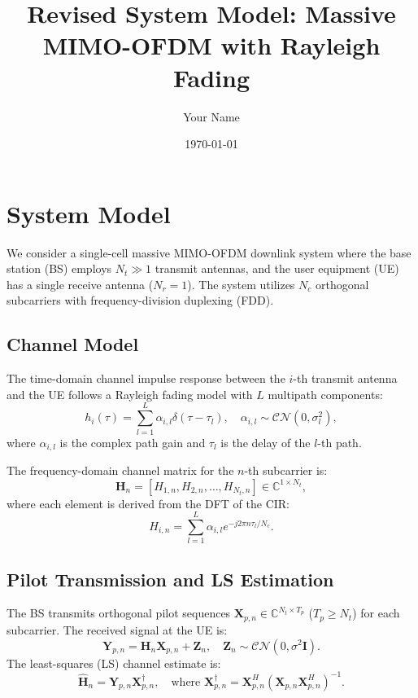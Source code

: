 \documentclass[10pt]{article}
\title{Revised System Model: Massive MIMO-OFDM with Rayleigh Fading}
\author{Your Name}
\date{\today}
\begin{document}
\maketitle

\section{System Model}
\label{sec:system_model}

We consider a single-cell massive MIMO-OFDM downlink system where the base station (BS) employs \(N_t \gg 1\) transmit antennas, and the user equipment (UE) has a single receive antenna (\(N_r = 1\)). The system utilizes \(N_c\) orthogonal subcarriers with frequency-division duplexing (FDD). 

\subsection{Channel Model}
The time-domain channel impulse response between the \(i\)-th transmit antenna and the UE follows a Rayleigh fading model with \(L\) multipath components:
\begin{equation}
h_i(\tau) = \sum_{l=1}^L \alpha_{i,l} \delta(\tau - \tau_l), \quad \alpha_{i,l} \sim \mathcal{CN}(0, \sigma_l^2),
\label{eq:cir}
\end{equation}
where \(\alpha_{i,l}\) is the complex path gain and \(\tau_l\) is the delay of the \(l\)-th path. 

The frequency-domain channel matrix for the \(n\)-th subcarrier is:
\begin{equation}
\mathbf{H}_n = \left[H_{1,n}, H_{2,n}, \dots, H_{N_t,n}\right] \in \mathbb{C}^{1 \times N_t},
\label{eq:freq_channel}
\end{equation}
where each element is derived from the DFT of the CIR:
\begin{equation}
H_{i,n} = \sum_{l=1}^L \alpha_{i,l} e^{-j 2\pi n \tau_l / N_c}.
\label{eq:subcarrier_channel}
\end{equation}

\subsection{Pilot Transmission and LS Estimation}
The BS transmits orthogonal pilot sequences \(\mathbf{X}_{p,n} \in \mathbb{C}^{N_t \times T_p}\) (\(T_p \geq N_t\)) for each subcarrier. The received signal at the UE is:
\begin{equation}
\mathbf{Y}_{p,n} = \mathbf{H}_n \mathbf{X}_{p,n} + \mathbf{Z}_n, \quad \mathbf{Z}_n \sim \mathcal{CN}(0, \sigma^2 \mathbf{I}).
\label{eq:received_pilot}
\end{equation}
The least-squares (LS) channel estimate is:
\begin{equation}
\hat{\mathbf{H}}_n = \mathbf{Y}_{p,n} \mathbf{X}_{p,n}^\dagger, \quad \text{where } \mathbf{X}_{p,n}^\dagger = \mathbf{X}_{p,n}^H (\mathbf{X}_{p,n} \mathbf{X}_{p,n}^H)^{-1}.
\label{eq:ls_estimate}
\end{equation}
\end{document}
